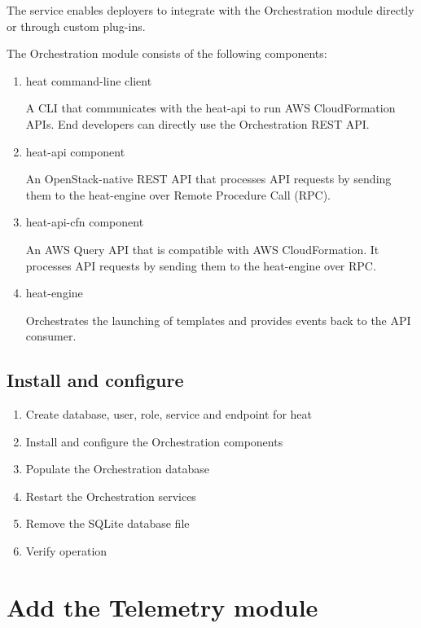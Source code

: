     \par The service enables deployers to integrate with the Orchestration module directly or through custom plug-ins.

    \par The Orchestration module consists of the following components:

    \begin{enumerate}
        \item heat command-line client
        \par A CLI that communicates with the heat-api to run AWS CloudFormation APIs. End developers can directly use the Orchestration REST API.

        \item heat-api component
        \par An OpenStack-native REST API that processes API requests by sending them to the heat-engine over Remote Procedure Call (RPC).

        \item heat-api-cfn component
        \par An AWS Query API that is compatible with AWS CloudFormation. It processes API requests by sending them to the heat-engine over RPC.

        \item heat-engine
        \par Orchestrates the launching of templates and provides events back to the API consumer.
    \end{enumerate}
    \subsection{Install and configure}
        \begin{enumerate}
            \item Create database, user, role, service and endpoint for heat
            \item Install and configure the Orchestration components
            \item Populate the Orchestration database
            \item Restart the Orchestration services
            \item Remove the SQLite database file
            \item Verify operation
        \end{enumerate}

\section{Add the Telemetry module}
